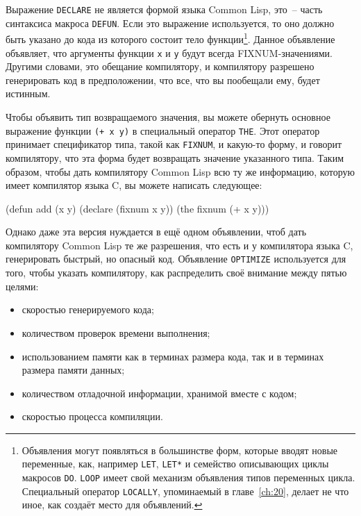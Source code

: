 Выражение \lstinline{DECLARE} не является формой языка Common Lisp, это~-- часть
синтаксиса макроса \lstinline{DEFUN}.  Если это выражение используется, то оно должно быть
указано до кода из которого состоит тело функции\footnote{Объявления могут появляться в
  большинстве форм, которые вводят новые переменные, как, например \lstinline{LET},
  \lstinline{LET*} и семейство описывающих циклы макросов \lstinline{DO}. \lstinline{LOOP}
  имеет свой механизм объявления типов переменных цикла. Специальный оператор
  \lstinline{LOCALLY}, упоминаемый в главе~\ref{ch:20}, делает не что иное, как создаёт
  место для объявлений.}\hspace{\footnotenegspace}. Данное объявление объявляет, что
аргументы функции \lstinline{x} и \lstinline{y} будут всегда FIXNUM-значениями. Другими
словами, это обещание компилятору, и компилятору разрешено генерировать код в
предположении, что все, что вы пообещали ему, будет истинным.

Чтобы объявить тип возвращаемого значения, вы можете обернуть основное выражение функции
\lstinline{(+ x y)} в специальный оператор \lstinline{THE}. Этот оператор принимает спецификатор
типа, такой как \lstinline{FIXNUM}, и какую-то форму, и говорит компилятору, что эта форма
будет возвращать значение указанного типа. Таким образом, чтобы дать компилятору Common
Lisp всю ту же информацию, которую имеет компилятор языка C, вы можете написать следующее:

\begin{myverb}
(defun add (x y)
  (declare (fixnum x y))
  (the fixnum (+ x y)))
\end{myverb}

Однако даже эта версия нуждается в ещё одном объявлении, чтоб дать компилятору Common Lisp
те же разрешения, что есть и у компилятора языка C, генерировать быстрый, но опасный
код. Объявление \lstinline{OPTIMIZE} используется для того, чтобы указать компилятору, как
распределить своё внимание между пятью целями:

\begin{itemize}
\item скоростью генерируемого кода;
\item количеством проверок времени выполнения;
\item использованием памяти как в терминах размера кода, так и в терминах размера памяти
  данных;
\item количеством отладочной информации, хранимой вместе с кодом;
\item скоростью процесса компиляции.
\end{itemize}

